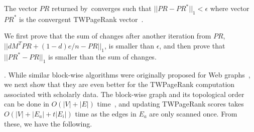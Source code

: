 %



\begin{cor} \label{prop-prscc}
The vector $PR$ returned by~\twprscc converges such that $||PR-PR^*||_1 < \epsilon$ where vector $PR^*$ is the convergent TWPageRank vector~\cite{Berkhin05}.
\end{cor}

\begin{proofSketch}
We first prove that the sum of changes after another iteration from $PR$, \ie $||d M^T PR + (1-d)e/n-PR||_1$, is smaller than $\epsilon$, and then prove that $||PR^*-PR||_1$ is smaller than the sum of changes. %
\end{proofSketch}





. While similar block-wise algorithms were originally proposed for Web graphs~\cite{Berkhin05}, we next show that they are even better for the TWPageRank computation associated with scholarly data.
%
The block-wise graph and its topological order can be done in $O(|V|+|E|)$ time~\cite{CormenLRS01}, and updating TWPageRank scores takes $O(|V|+|E_a|+t|E_i|)$ time as the edges in $E_a$ are only scanned once.
From these, we have the following.



